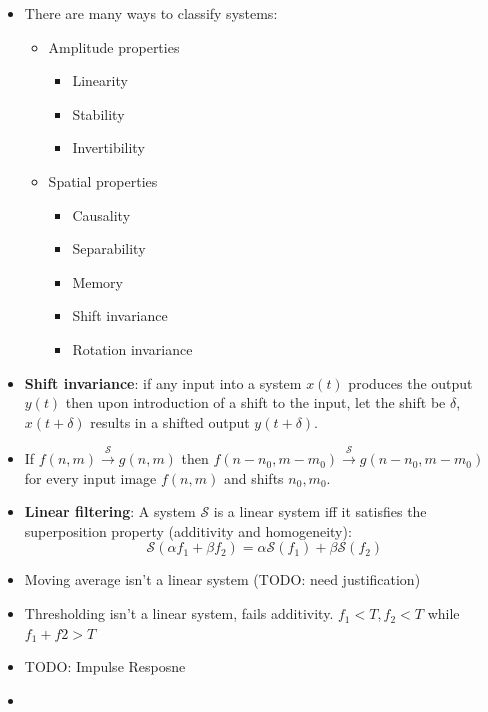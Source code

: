 \begin{itemize}[--]
	\item There are many ways to classify systems:
	\begin{itemize}[--]
		\item Amplitude properties
		\begin{itemize}[--]
			\item Linearity
			\item Stability
			\item Invertibility
		\end{itemize}

		\item Spatial properties
		\begin{itemize}[--]
			\item Causality
			\item Separability
			\item Memory
			\item Shift invariance
			\item Rotation invariance
		\end{itemize}
	\end{itemize}

	\item \textbf{Shift invariance}: if any input into a system $x(t)$ produces the output $y(t)$ then upon introduction of a shift to the input, let the shift be $\delta$, $x(t+\delta)$ results in a shifted output $y(t+\delta)$. 
	\item If $f(n,m)\xrightarrow{\mathcal{S}} g(n,m)$ then $f(n-n_0, m-m_0)\xrightarrow{\mathcal{S}} g(n-n_0, m-m_0)$ for every input image $f(n,m)$ and shifts $n_0, m_0$.
	\item \textbf{Linear filtering}: A system $\mathcal{S}$ is a linear system iff it satisfies the superposition property (additivity and homogeneity):
		$$\mathcal{S}(\alpha f_1 + \beta f_2) = \alpha\mathcal{S}(f_1) + \beta\mathcal{S} (f_2)$$
	\item Moving average isn't a linear system (TODO: need justification)
	\item Thresholding isn't a linear system, fails additivity. $f_1 < T, f_2 < T$ while $f_1+f2 > T$
	\item TODO: Impulse Resposne
	\item 
\end{itemize}